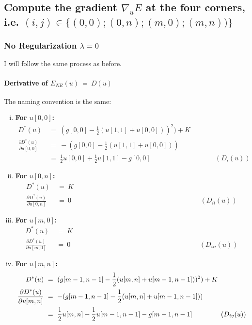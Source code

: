 \documentclass{report}
\begin{document}
		\subsection{Compute the gradient $\nabla_u E$ at the four corners, \\ i.e. $(i,j) \in \{ (0,0); (0,n);(m,0);(m,n)) \}$}
		\startsubsection
			\subsubsection{No Regularization $\lambda = 0$}
			\startsubsection
				I will follow the same process as before.
				\vspace{-0.4cm} \paragraph{Derivative of  $E_{NR}(u) \ = \ D(u)$}
				\startsubsection
					\vspace{0.2cm} The naming convention is the same:
					\begin{enumerate}[(i)]
						\item \textbf{For $u[0,0]$:}
						\vspace{-0.4cm}
						\begin{align*}
							D^*(u) \ & = \ (g[0,0] - \frac{1}{2} (u[1,1] + u[0,0]))^2) + K \\
							\frac{\partial D^*(u)}{\partial u[0,0]} \ & = \ - (g[0,0] - \frac{1}{2} (u[1,1] + u[0,0])) \\
							& = \ \frac{1}{2} u[0,0]  + \frac{1}{2} u[1,1] - g[0,0] \hspace{4cm} (D_{i}(u))
						\end{align*}
						\item \textbf{For $u[0,n]$:}
						\vspace{-0.4cm}
						\begin{align*}
							D^*(u) \ & = \ K \\
							\frac{\partial D^*(u)}{\partial u[0,n]} \ & = \ 0 \hspace{8cm} (D_{ii}(u))
						\end{align*}
						\item \textbf{For $u[m,0]$:}
						\vspace{-0.4cm}
						\begin{align*}
							D^*(u) \ & = \ K \\
							\frac{\partial D^*(u)}{\partial u[m,0]} \ & = \ 0 \hspace{8cm} (D_{iii}(u))
						\end{align*}
						\item \textbf{For $u[m,n]$:}
						\vspace{-0.4cm}
						\begin{align*}
							D^*(u) \ & = \ (g[m-1,n-1] - \frac{1}{2} (u[m,n] + u[m-1,n-1]))^2) + K \\
							\frac{\partial D^*(u)}{\partial u[m,n]} \ & = \ - (g[m-1,n-1] - \frac{1}{2} (u[m,n] + u[m-1,n-1])) \\
							& = \ \frac{1}{2} u[m,n]  + \frac{1}{2} u[m-1,n-1] - g[m-1,n-1] \hspace{1.5cm} (D_{iv}(u))
						\end{align*}
					\end{enumerate}
				\closesection
			\closesection
\end{document}
